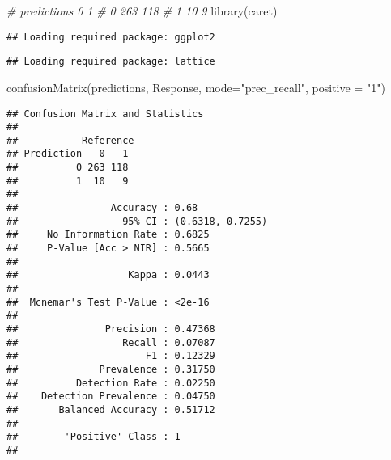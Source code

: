 \documentclass[
]{article}
\newenvironment{Shaded}{\begin{snugshade}}{\end{snugshade}}
\newcommand{\AttributeTok}[1]{\textcolor[rgb]{0.77,0.63,0.00}{#1}}
\newcommand{\CommentTok}[1]{\textcolor[rgb]{0.56,0.35,0.01}{\textit{#1}}}
\newcommand{\FunctionTok}[1]{\textcolor[rgb]{0.00,0.00,0.00}{#1}}
\newcommand{\NormalTok}[1]{#1}
\newcommand{\StringTok}[1]{\textcolor[rgb]{0.31,0.60,0.02}{#1}}
\begin{document}
\begin{Shaded}
\begin{Highlighting}[]
    \CommentTok{\# predictions      0   1}
    \CommentTok{\#               0 263 118}
    \CommentTok{\#               1  10   9}
\FunctionTok{library}\NormalTok{(caret)}
\end{Highlighting}
\end{Shaded}

\begin{verbatim}
## Loading required package: ggplot2
\end{verbatim}

\begin{verbatim}
## Loading required package: lattice
\end{verbatim}

\begin{Shaded}
\begin{Highlighting}[]
\FunctionTok{confusionMatrix}\NormalTok{(predictions, Response, }\AttributeTok{mode=}\StringTok{"prec\_recall"}\NormalTok{, }\AttributeTok{positive =} \StringTok{"1"}\NormalTok{)}
\end{Highlighting}
\end{Shaded}

\begin{verbatim}
## Confusion Matrix and Statistics
## 
##           Reference
## Prediction   0   1
##          0 263 118
##          1  10   9
##                                           
##                Accuracy : 0.68            
##                  95% CI : (0.6318, 0.7255)
##     No Information Rate : 0.6825          
##     P-Value [Acc > NIR] : 0.5665          
##                                           
##                   Kappa : 0.0443          
##                                           
##  Mcnemar's Test P-Value : <2e-16          
##                                           
##               Precision : 0.47368         
##                  Recall : 0.07087         
##                      F1 : 0.12329         
##              Prevalence : 0.31750         
##          Detection Rate : 0.02250         
##    Detection Prevalence : 0.04750         
##       Balanced Accuracy : 0.51712         
##                                           
##        'Positive' Class : 1               
## 
\end{verbatim}
\end{document}
